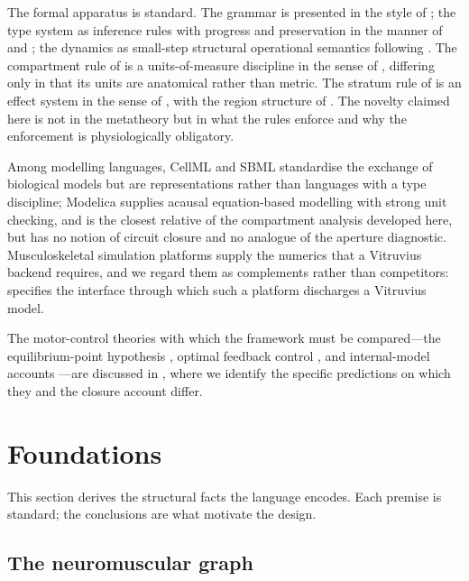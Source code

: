 \documentclass[11pt,twocolumn,a4paper]{article}
\theoremstyle{thmstyle}
\theoremstyle{definition}
\theoremstyle{remark}
\begin{document}
The formal apparatus is standard. The grammar is presented in the style of
\citet{aho2006}; the type system as inference rules with progress and
preservation in the manner of \citet{wright1994} and \citet{pierce2002}; the
dynamics as small-step structural operational semantics following
\citet{plotkin1981}. The compartment rule of  is a
units-of-measure discipline in the sense of \citet{kennedy1997}, differing
only in that its units are anatomical rather than metric. The stratum rule of
 is an effect system in the sense of \citet{lucassen1988},
with the region structure of \citet{tofte1997}. The novelty claimed here is
not in the metatheory but in what the rules enforce and why the enforcement is
physiologically obligatory.

Among modelling languages, CellML \citep{hedley2001} and SBML
\citep{hucka2003} standardise the exchange of biological models but are
representations rather than languages with a type discipline; Modelica
\citep{fritzson2014} supplies acausal equation-based modelling with strong
unit checking, and is the closest relative of the compartment analysis
developed here, but has no notion of circuit closure and no analogue of the
aperture diagnostic. Musculoskeletal simulation platforms
\citep{delp2007,seth2018,todorov2012} supply the numerics that a Vitruvius
backend requires, and we regard them as complements rather than competitors:
 specifies the interface through which such a platform
discharges a Vitruvius model.

The motor-control theories with which the framework must be compared---the
equilibrium-point hypothesis \citep{feldman1986}, optimal feedback control
\citep{todorov2002}, and internal-model accounts
\citep{kawato1999,wolpert2000}---are discussed in , where
we identify the specific predictions on which they and the closure account
differ.

\section{Foundations}
\label{sec:foundations}

This section derives the structural facts the language encodes. Each premise
is standard; the conclusions are what motivate the design.

\subsection{The neuromuscular graph}
\end{document}
